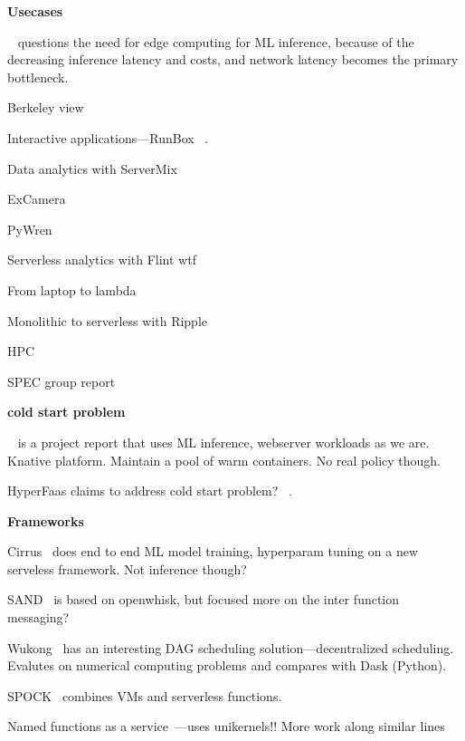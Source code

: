 


\noindent \textbf{Usecases}

~\cite{cartas_reality_2019} questions the need for edge computing for ML inference, because of the decreasing inference latency and costs, and network latency becomes the primary bottleneck.

Berkeley view~\cite{jonas2017occupy, jonas_cloud_2019}

Interactive applications---RunBox ~\cite{glikson_runbox_2019}.

Data analytics with ServerMix~\cite{garcia-lopez_servermix_2019}

ExCamera

PyWren

Serverless analytics with Flint wtf

From laptop to lambda ~\cite{fouladi_laptop_2019}

Monolithic to serverless with Ripple~\cite{joyner_ripple_2020}

HPC~\cite{mocskos_faaster_2018}

SPEC group report~\cite{van_eyk_spec_2017}

\noindent \textbf{cold start problem}

~\cite{lin_mitigating_2019} is a project report that uses ML inference, webserver workloads as we are. Knative platform. Maintain a pool of warm containers. No real policy though.

HyperFaas claims to address cold start problem? ~\cite{zhang_hyperfaas_2019}. 

\noindent \textbf{Frameworks}

Cirrus~\cite{carreira_cirrus_2019} does end to end ML model training, hyperparam tuning on a new serveless framework. Not inference though?

SAND~\cite{akkus_sand_2018} is based on openwhisk, but focused more on the inter function messaging?

Wukong~\cite{carver_search_2019} has an interesting DAG scheduling solution---decentralized scheduling. Evalutes on numerical computing problems and compares with Dask (Python).

SPOCK~\cite{gunasekaran_spock_2019} combines VMs and serverless functions. 

Named functions as a service~\cite{krol_nfaas_2017}---uses unikernels!!
More work along similar lines~\cite{lin_computation_2019,mtibaa_towards_2018,xylomenos_named_2019,krol_computation_2018}


